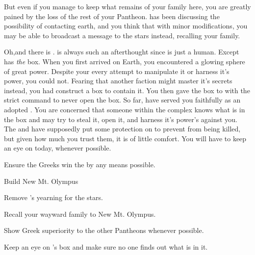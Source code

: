 \documentclass[char]{guardians}
\begin{document}
But even if you manage to keep what remains of your family here, you are greatly pained by the loss of the rest of your Pantheon.  \cHephaestus{} has been discussing the possibility of contacting earth, and you think that with minor modifications, you may be able to broadcast a message to the stars instead, recalling your family.

Oh,and there is \cPandora{}. \cPandora{\They} is always such an afterthought since  is just a human. Except \cPandora{} has \emph{the} box. When you first arrived on Earth, you encountered a glowing sphere of great power. Despite your every attempt to manipulate it or harness it's power, you could not. Fearing that another faction might master it's secrets instead, you had \cHephaestus{} construct a box to contain it. You then gave the box to \cPandora{} with the strict command to never open the box. So far, \cPandora{\they} have served you faithfully as an adopted \cPandora{\offspring}. You are concerned that someone within the complex knows what is in the box and may try to steal it, open it, and harness it's power's against you. The \cCaretaker{} and \cWarden{} have supposedly put some protection on \cPandora{} to prevent \cPandora{\them} from being killed, but given how much you trust them, it is of little comfort. You will have to keep an eye on \cPandora{} today, whenever possible.



\begin{itemz}[Goals]
  \item Ensure the Greeks win the \pGames{} by any means possible.
  \item Build New Mt. Olympus
  \item Remove \cAthena{}'s yearning for the stars.
  \item Recall your wayward family to New Mt. Olympus.
  \item Show Greek superiority to the other Pantheons whenever possible.
  \item Keep an eye on \cPandora{}'s box and make sure no one finds out what is in it.
\end{itemz}


\begin{contacts}
  \contact{}
\end{contacts}
\end{document}
